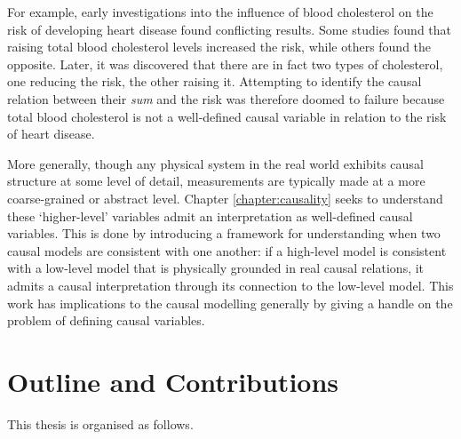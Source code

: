 For example, early investigations into the influence of blood cholesterol on the risk of developing heart disease found conflicting results.
Some studies found that raising total blood cholesterol levels increased the risk, while others found the opposite. 
Later, it was discovered that there are in fact two types of cholesterol, one reducing the risk, the other raising it. 
Attempting to identify the causal relation between their \emph{sum} and the risk was therefore doomed to failure because total blood cholesterol is not a well-defined causal variable in relation to the risk of heart disease.

More generally, though any physical system in the real world exhibits causal structure at some level of detail, measurements are typically made at a more coarse-grained or abstract level. 
Chapter \ref{chapter:causality} seeks to understand these `higher-level' variables admit an interpretation as well-defined causal variables.
This is done by introducing a framework for understanding when two causal models are consistent with one another: if a high-level model is consistent with a low-level model that is physically grounded in real causal relations, it admits a causal interpretation through its connection to the low-level model.
This work has implications to the causal modelling generally by giving a handle on the problem of defining causal variables. 




\section{Outline and Contributions}

This thesis is organised as follows.

